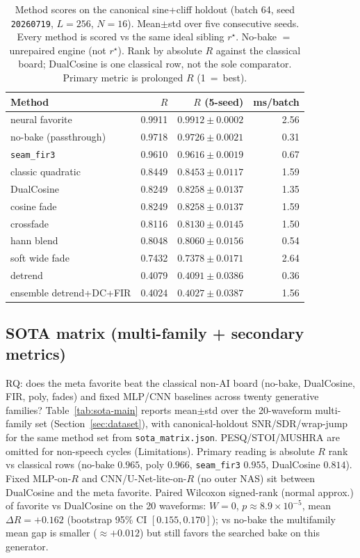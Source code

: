 \begin{table}[t]
  \centering
  \caption{Method scores on the canonical sine{+}cliff holdout (batch 64, seed \texttt{20260719}, $L{=}256$, $N{=}16$). Mean$\pm$std over five consecutive seeds. Every method is scored vs the same ideal sibling $r^{\star}$. No-bake $=$ unrepaired engine (not $r^{\star}$). Rank by absolute $R$ against the classical board; DualCosine is one classical row, not the sole comparator. Primary metric is prolonged $R$ (1~=~best).}
  \label{tab:canonical-methods}
  \setlength{\tabcolsep}{3pt}
  \begin{tabular}{@{}lrrr@{}}
    \toprule
    Method & $R$ & $R$ (5-seed) & ms/batch \\
    \midrule
    neural favorite & 0.9911 & $0.9912\pm0.0002$ & 2.56 \\
    no-bake (passthrough) & 0.9718 & $0.9726\pm0.0021$ & 0.31 \\
    \texttt{seam\_fir3} & 0.9610 & $0.9616\pm0.0019$ & 0.67 \\
    classic quadratic & 0.8449 & $0.8453\pm0.0117$ & 1.59 \\
    DualCosine & 0.8249 & $0.8258\pm0.0137$ & 1.35 \\
    cosine fade & 0.8249 & $0.8258\pm0.0137$ & 1.59 \\
    crossfade & 0.8116 & $0.8130\pm0.0145$ & 1.50 \\
    hann blend & 0.8048 & $0.8060\pm0.0156$ & 0.54 \\
    soft wide fade & 0.7432 & $0.7378\pm0.0171$ & 2.64 \\
    detrend & 0.4079 & $0.4091\pm0.0386$ & 0.36 \\
    ensemble detrend{+}DC{+}FIR & 0.4024 & $0.4027\pm0.0387$ & 1.56 \\
    \bottomrule
  \end{tabular}
\end{table}

\subsection{SOTA matrix (multi-family + secondary metrics)}
\label{sec:sota-main}

RQ: does the meta favorite beat the classical non-AI board (no-bake, DualCosine, FIR, poly, fades) and fixed MLP/CNN baselines across twenty generative families?
Table~\ref{tab:sota-main} reports mean$\pm$std over the 20-waveform multi-family set (Section~\ref{sec:dataset}), with canonical-holdout SNR/SDR/wrap-jump for the same method set from \texttt{sota\_matrix.json}.
PESQ/STOI/MUSHRA are omitted for non-speech cycles (Limitations).
Primary reading is absolute $R$ rank vs classical rows (no-bake $0.965$, poly $0.966$, \texttt{seam\_fir3} $0.955$, DualCosine $0.814$).
Fixed MLP-on-$R$ and CNN/U-Net-lite-on-$R$ (no outer NAS) sit between DualCosine and the meta favorite.
Paired Wilcoxon signed-rank (normal approx.) of favorite vs DualCosine on the 20 waveforms: $W{=}0$, $p{\approx}8.9{\times}10^{-5}$, mean $\Delta R{=}{+}0.162$ (bootstrap 95\% CI $[0.155,0.170]$); vs no-bake the multifamily mean gap is smaller ($\approx{+}0.012$) but still favors the searched bake on this generator.

